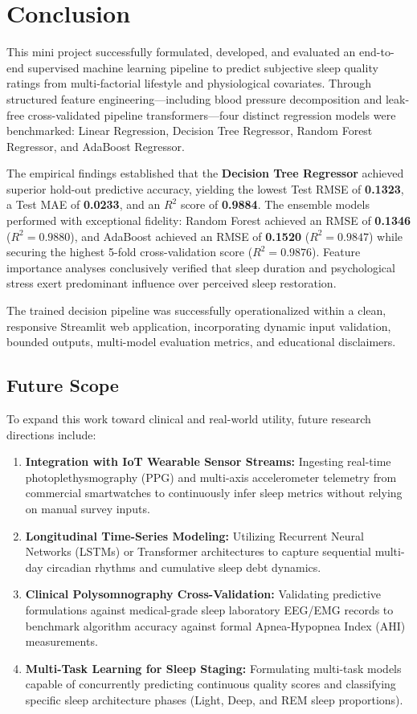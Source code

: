 \documentclass[12pt,a4paper]{article}
\begin{document}
\section{Conclusion}
This mini project successfully formulated, developed, and evaluated an end-to-end supervised machine learning pipeline to predict subjective sleep quality ratings from multi-factorial lifestyle and physiological covariates. Through structured feature engineering---including blood pressure decomposition and leak-free cross-validated pipeline transformers---four distinct regression models were benchmarked: Linear Regression, Decision Tree Regressor, Random Forest Regressor, and AdaBoost Regressor.

The empirical findings established that the \textbf{Decision Tree Regressor} achieved superior hold-out predictive accuracy, yielding the lowest Test RMSE of \textbf{0.1323}, a Test MAE of \textbf{0.0233}, and an $R^2$ score of \textbf{0.9884}. The ensemble models performed with exceptional fidelity: Random Forest achieved an RMSE of \textbf{0.1346} ($R^2 = 0.9880$), and AdaBoost achieved an RMSE of \textbf{0.1520} ($R^2 = 0.9847$) while securing the highest 5-fold cross-validation score ($R^2 = \mathbf{0.9876}$). Feature importance analyses conclusively verified that sleep duration and psychological stress exert predominant influence over perceived sleep restoration.

The trained decision pipeline was successfully operationalized within a clean, responsive Streamlit web application, incorporating dynamic input validation, bounded outputs, multi-model evaluation metrics, and educational disclaimers.

\subsection{Future Scope}
To expand this work toward clinical and real-world utility, future research directions include:
\begin{enumerate}
    \item \textbf{Integration with IoT Wearable Sensor Streams:} Ingesting real-time photoplethysmography (PPG) and multi-axis accelerometer telemetry from commercial smartwatches to continuously infer sleep metrics without relying on manual survey inputs.
    \item \textbf{Longitudinal Time-Series Modeling:} Utilizing Recurrent Neural Networks (LSTMs) or Transformer architectures to capture sequential multi-day circadian rhythms and cumulative sleep debt dynamics.
    \item \textbf{Clinical Polysomnography Cross-Validation:} Validating predictive formulations against medical-grade sleep laboratory EEG/EMG records to benchmark algorithm accuracy against formal Apnea-Hypopnea Index (AHI) measurements.
    \item \textbf{Multi-Task Learning for Sleep Staging:} Formulating multi-task models capable of concurrently predicting continuous quality scores and classifying specific sleep architecture phases (Light, Deep, and REM sleep proportions).
\end{enumerate}
\end{document}
